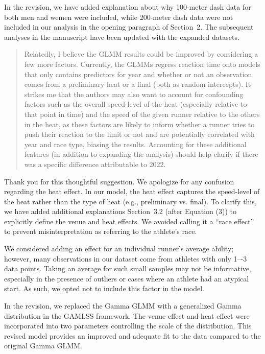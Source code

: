 \documentclass[12pt]{article}
\newenvironment{comment}%
{\begin{quotation}\noindent\small\it\color{darkblue}\ignorespaces%
}{\end{quotation}}
\begin{document}
In the revision, we have added explanation about why 100-meter dash
data for both men and wemen were included, while 200-meter dash data
were not included in our analysis in the opening paragraph of Section~2.
The subsequent analyses in the manuscript have been updated with the
expanded datasets.


\begin{comment}
Relatedly, I believe the GLMM results could be improved by considering a few
more factors. Currently, the GLMMs regress reaction time onto models that only
contains predictors for year and whether or not an observation comes from a
preliminary heat or a final (both as random intercepts). It strikes me that the
authors may also want to account for confounding factors such as the overall
speed-level of the heat (especially relative to that point in time) and the
speed of the given runner relative to the others in the heat, as these factors
are likely to inform whether a runner tries to push their reaction to the limit
or not and are potentially correlated with year and race type, biasing the
results. Accounting for these additional features (in addition to expanding the
analysis) should help clarify if there was a specific difference attributable to
2022.
\end{comment}


Thank you for this thoughtful suggestion. We apologize for any
confusion regarding the heat effect. In our model, the heat effect
captures the speed-level of the heat rather than the type of heat
(e.g., preliminary vs. final). To clarify this, we have added
additional explanations Section~3.2 (after Equation (3)) to
explicitly define the venue and heat effects. We avoided calling it a
``race effect'' to prevent misinterpretation as referring to the
athlete's race.


We considered adding an effect for an individual runner’s average
ability; however, many observations in our dataset come from athletes
with only 1–-3 data points. Taking an average for such small samples
may not be informative, especially in the presence of outliers or
cases where an athlete had an atypical start. As such, we opted not to
include this factor in the model.


In the revision, we replaced the Gamma GLMM with a generalized Gamma
distribution in the GAMLSS framework. The venue effect and heat effect
were incorporated into two parameters controlling the scale of the
distribution. This revised model provides an improved and adequate fit
to the data compared to the original Gamma GLMM.
\end{document}
